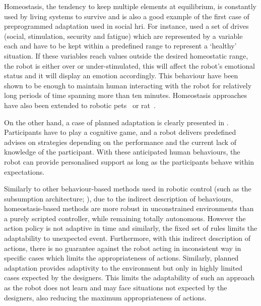 	
	Homeostasis, the tendency to keep multiple elements at equilibrium, is constantly used by living systems to survive and is also a good example of the first case of preprogrammed adaptation used in social \gls{hri}. For instance, \citet{breazeal1998motivational} used a set of drives (social, stimulation, security and fatigue) which are represented by a variable each and have to be kept within a predefined range to represent a `healthy' situation. If these variables reach values outside the desired homeostatic range, the robot is either over or under-stimulated, this will affect the robot's emotional status and it will display an emotion accordingly. This behaviour have been shown to be enough to maintain human interacting with the robot for relatively long periods of time spanning more than ten minutes. Homeostasis approaches have also been extended to robotic pets~\citep{arkin2003ethological} or \gls{rat}~\citep{cao2017collaborative}.
	
	On the other hand, a case of planned adaptation is clearly presented in \citet{leyzberg2014personalizing}. Participants have to play a cognitive game,  and a robot delivers predefined advises on strategies depending on the performance and the current lack of knowledge of the participant. With these anticipated human behaviours, the robot can provide personalised support as long as the participants behave within expectations. 

	
	Similarly to other behaviour-based methods used in robotic control (such as the subsumption architecture; \citealt{brooks1986robust}), due to the indirect description of behaviours, homeostasis-based methods are more robust in unconstrained environments than a purely scripted controller, while remaining totally autonomous. However the action policy is not adaptive in time and similarly, the fixed set of rules limits the adaptability to unexpected event. Furthermore, with this indirect description of actions, there is no guarantee against the robot acting in inconsistent way in specific cases which limits the appropriateness of actions. Similarly, planned adaptation provides adaptivity to the environment but only in highly limited cases expected by the designers. This limits the adaptability of such an approach as the robot does not learn and may face situations not expected by the designers, also reducing the maximum appropriateness of actions.

